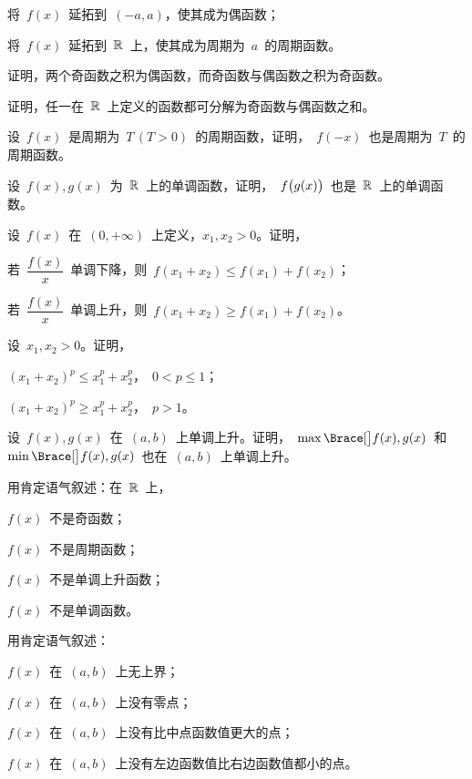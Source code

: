 \begin{exercise}
\begin{exlist}
  \item 将~$f(x)$~延拓到~$(-a,a)$，使其成为偶函数；
  \item 将~$f(x)$~延拓到~$\mathbb{R}$~上，使其成为周期为~$a$~的周期函数。
\end{exlist}
\item 证明，两个奇函数之积为偶函数，而奇函数与偶函数之积为奇函数。
\item 证明，任一在~$\mathbb{R}$~上定义的函数都可分解为奇函数与偶函数之和。
\item 设~$f(x)$~是周期为~$T\,(T>0)$~的周期函数，证明，~$f(-x)$~也是周期为~$T$~的周期函数。
\item 设~$f(x),g(x)$~为~$\mathbb{R}$~上的单调函数，证明，~$f\bigl\lparen g(x)\bigr\rparen$~也是~$\mathbb{R}$~上的单调函数。
\item 设~$f(x)$~在~$(0,+\infty)$~上定义，$x_1,x_2>0$。证明，
\begin{exlist}
  \item 若~$\dfrac{f(x)}x$~单调下降，则~$f(x_1+x_2)\leq f(x_1)+f(x_2)$；
  \item 若~$\dfrac{f(x)}x$~单调上升，则~$f(x_1+x_2)\geq f(x_1)+f(x_2)$。
\end{exlist}
\item 设~$x_1,x_2>0$。证明，
\begin{exlistcols}
  \item $(x_1+x_2)^p\leq x_1^p+x_2^p$，~$0<p\leq1$；
  \item $(x_1+x_2)^p\geq x_1^p+x_2^p$，~$p>1$。
\end{exlistcols}
\item 设~$f(x),g(x)$~在~$(a,b)$~上单调上升。证明，~$\max\Braceb{f(x),g(x)}$~和~$\min\Braceb{f(x),g(x)}$~也在~$(a,b)$~上单调上升。
\item 用肯定语气叙述：在~$\mathbb{R}$~上，
\begin{exlistcols}
  \item $f(x)$~不是奇函数；
  \item $f(x)$~不是周期函数；
  \item $f(x)$~不是单调上升函数；
  \item $f(x)$~不是单调函数。
\end{exlistcols}
\item 用肯定语气叙述：
\begin{exlistcols}
  \item $f(x)$~在~$(a,b)$~上无上界；
  \item $f(x)$~在~$(a,b)$~上没有零点；
  \item $f(x)$~在~$(a,b)$~上没有比中点函数值更大的点；
  \item $f(x)$~在~$(a,b)$~上没有左边函数值比右边函数值都小的点。
\end{exlistcols}
\end{exercise}

